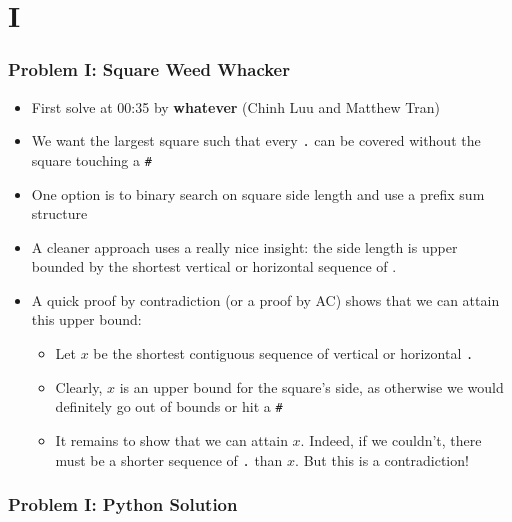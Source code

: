 \section{I}%
\label{sec:i}

\begin{frame}
  \frametitle{Problem I: Square Weed Whacker}

  \begin{itemize}
    \item First solve at 00:35 by \textbf{whatever} (Chinh Luu and Matthew Tran)
    \item We want the largest square such that every \texttt{.} can be covered without the square touching a \texttt{\#}
    \item One option is to binary search on square side length and use a prefix sum structure
    \item A cleaner approach uses a really nice insight: the side length is upper bounded by the shortest vertical or horizontal sequence of $\texttt{.}$
    \item A quick proof by contradiction (or a proof by AC) shows that we can attain this upper bound:
      \begin{itemize}
        \item Let $x$ be the shortest contiguous sequence of vertical or horizontal \texttt{.}
        \item Clearly, $x$ is an upper bound for the square's side, as otherwise we would definitely go out of bounds or hit a \texttt{\#}
        \item It remains to show that we can attain $x$. Indeed, if we couldn't, there must be a shorter sequence of \texttt{.} than $x$. But this is a contradiction!
      \end{itemize}
  \end{itemize}
\end{frame}

\begin{frame}
  \frametitle{Problem I: Python Solution}
\end{frame}